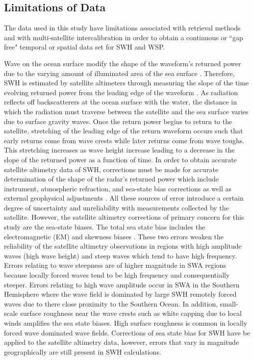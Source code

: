 \documentclass[draft,linenumbers]{agujournal2018}
\begin{document}
\subsection{Limitations of Data}

The data used in this study have limitations associated with retrieval methods and with multi-satellite intercalibration in order to obtain a continuous or ``gap free" temporal or spatial data set for SWH and WSP. 

Wave on the ocean surface modify the shape of the waveform's returned power due to the varying amount of illuminated area of the sea surface \cite{chelton2001satellite}. Therefore, SWH is estimated by satellite altimeters through measuring the slope of the time evolving returned power from the leading edge of the waveform \cite{chelton2001satellite}. As radiation reflects off backscatterers at the ocean surface with the water, the distance in which the radiation must traverse between the satellite and the sea surface varies due to surface gravity waves. Once the return power begins to return to the satellite, stretching of the leading edge of the return waveform occurs such that early returns come from wave crests while later returns come from wave toughs. This stretching increases as wave height increase leading to a decrease in the slope of the returned power as a function of time. In order to obtain accurate satellite altimetry data of SWH, corrections must be made for accurate determination of the shape of the radar's returned power which include instrument, atmospheric refraction, and sea-state bias corrections as well as external geophysical adjustments \cite{chelton2001satellite}. All these sources of error introduce a certain degree of uncertainty and unreliability with measurements collected by the satellite. However, the satellite altimetry corrections of primary concern for this study are the sea-state biases. The total sea state bias includes the electromagnetic (EM) and skewness biases \cite{chelton2001satellite}. These two errors weaken the reliability of the satellite altimetry observations in regions with high amplitude waves (high wave height) and steep waves which tend to have high frequency. Errors relating to wave steepness are of higher magnitude in SWA regions because locally forced waves tend to be high frequency and consequentially steeper. Errors relating to high wave amplitude occur in SWA in the Southern Hemisphere where the wave field is dominated by large SWH remotely forced waves due to there close proximity to the Southern Ocean. In addition, small-scale surface roughness near the wave crests such as white capping due to local winds amplifies the sea state biases. High surface roughness is common in locally forced wave dominated wave fields. Corrections of sea state bias for SWH have be applied to the satellite altimetry data, however, errors that vary in magnitude geographically are still present in SWH calculations.
\end{document}

